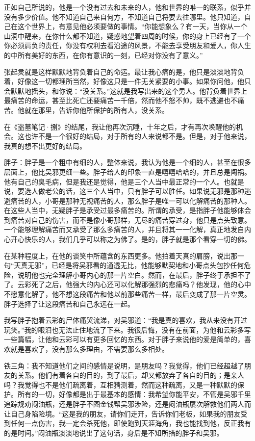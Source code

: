 正如自己所说的，他是一个没有过去和未来的人，他和世界的唯一的联系，似乎并没有多少价值。他不知道自己来自何方，不知道自己将要去往哪里。他只知道，自己在这个世界上，有意见他必须要做的事情。“你能想象么？有一天，当你从一个山洞中醒来，在你什么都不知道，疑惑地望着四周的时候，你的身上已经有了一个你必须肩负的责任，你没有权利去看沿途的风景，不能去享受朋友和爱人，你人生的中所有美好的东西，在你有意识的一刻，已经对你没有了意义。”

张起灵就是这样默默地背负着自己的命运。最让我心痛的是，他只是淡淡地背负着，好像这一切都理所当然，好像这只是一件无关紧要的小事。如果你问他，他只会默默地摇头，和你说：“没关系。”这就是我写出来的这个男人。他背负着世界上最痛苦的命运，甚至比死亡还要痛苦一千倍，然而他不怒不帅，既不逃避也不痛苦。他就在那里，告诉你他所保护的所有人，没关系。

在《盗墓笔记·捌》的结尾，我让他再次沉睡，十年之后，才有再次唤醒他的机会。这也许不是一个很好的结局，对于所有的人来说都不是。但是，对于他来说，我真的想不出更好的结局。

胖子：胖子是一个粗中有细的人，整体来说，我认为他是一个细的人，甚至在很多层面上，他比吴邪更细一些。胖子给人的印象一直是嘻嘻哈哈的，并且总是闯祸。他有自己的臭毛病，但是我还是觉得，他是三个人当中最正常的一个人。也就是说，要选人做老公的话，这三个人当中，只有胖子可以胜任。如果说无邪是那种逃避痛苦的人，小哥是那种无视痛苦的人，那么胖子是唯一可以化解痛苦的那种人。在这些人当中，无疑胖子是承受过最多痛苦的。所谓的承受，是指胖子他能够体会到痛苦对自己的伤害，而不是像小哥那样，无尽的痛苦穿过身，他只是点头致意。一个能够理解痛苦而又承受了那么多痛苦的人，并且将其一一化解，真正地发自内心开心快乐的人，我们几乎可以称之为佛了。是的，胖子就是那个看穿一切的佛。

在某种程度上，在他的谈笑中所蕴含的东西更多。他拍着天真的肩膀，说出那一句“天真无邪”，已经是将吴邪看的通透无比，他能够默契地和小哥点头包抄任何危险，说明他也完全理解小哥内心的那一片空白。然而，在最后，胖子终于承担不了了。云彩死了之后，他强大的内心还可以化解那强烈的悲痛吗？他发现，他的心中不愿意化解了，他不想这段痛苦和他以前那些痛苦一样，最后变成了那一片空灵。胖子选择了让这段痛苦和自己永远在一起。

我写胖子抱着云彩的尸体痛哭流涕，对吴邪道：“我是真的喜欢，我从来没有开过玩笑。”我的眼泪也无法止住地流了下来。我很后悔，没有在前面，为他和云彩多写一些篇幅，让他和云彩可以有更多回忆的东西。对于胖子来说他的爱是简单的，喜欢就是喜欢了，没有那么多理由，不需要那么多相处。

铁三角：我不知道他们之间的感情是说明，是朋友吗？我觉得，他们已经超越了朋友的关系。他们有着各自的目的，到了最后，却又都放弃了各自的目的；是亲人吗？我觉得也不是他们疏离着，互相猜测着，然而这种疏离，又是一种默默的保护。所有的一切，好像都是出于最基本的感情：我希望你能平安，不管是吴邪千里追踪规劝闷油瓶，还是胖子不图金钱帮吴邪涉险，还是闷油瓶屡次解救他们两人而让自己身陷险境。“这是我的朋友，请你们走开，告诉你们老板，如果我的朋友受到任何一点伤害，我一定会杀死他，即使跑到天涯海角，我也能找到他，反正我有的是时间。”闷油瓶淡淡地说出了这句话，身后是不知所措的胖子和吴邪。


